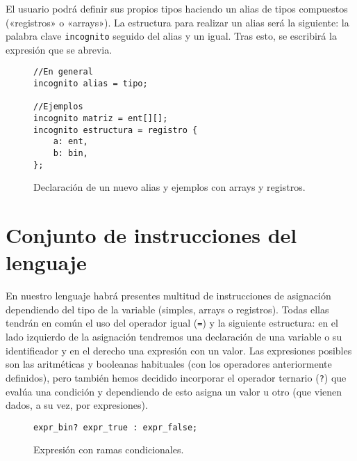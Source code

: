 El usuario podrá definir sus propios tipos haciendo un alias de tipos
compuestos («registros» o «arrays»). La estructura para realizar un alias será la
siguiente: la palabra clave \lstinline{incognito} seguido del alias y un igual. Tras esto,
se escribirá la expresión que se abrevia.
\begin{figure}[H]
    \centering
    \begin{lstlisting}
//En general
incognito alias = tipo;

//Ejemplos
incognito matriz = ent[][];
incognito estructura = registro {
    a: ent,
    b: bin,
};
    \end{lstlisting}
    \caption{Declaración de un nuevo alias y ejemplos con arrays y registros.}
\end{figure}

\section*{Conjunto de instrucciones del lenguaje}
En nuestro lenguaje habrá presentes multitud de instrucciones de asignación
dependiendo del tipo de la variable (simples, arrays o registros). Todas ellas
tendrán en común el uso del operador igual (\lstinline{=}) y la siguiente estructura: en el
lado izquierdo de la asignación tendremos una declaración de una variable o su
identificador y en el derecho una expresión con un valor. Las expresiones
posibles son las aritméticas y booleanas habituales (con los operadores
anteriormente definidos), pero también hemos decidido incorporar el operador
ternario (\lstinline{?}) que evalúa una condición y dependiendo de esto asigna un valor u
otro (que vienen dados, a su vez, por expresiones). 
\begin{figure}[H]
    \centering
    \begin{lstlisting}
expr_bin? expr_true : expr_false;
    \end{lstlisting}
    \caption{Expresión con ramas condicionales.}
\end{figure}

